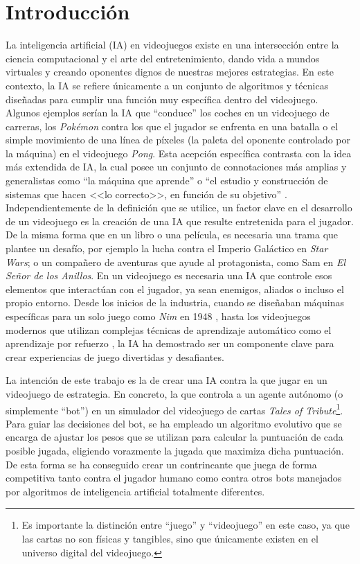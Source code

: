 \chapter{Introducción} \label{chap:introduccion}

La inteligencia artificial (IA) en videojuegos existe en una intersección entre la ciencia computacional y el arte del entretenimiento, dando vida a mundos virtuales y creando oponentes dignos de nuestras mejores estrategias. En este contexto, la IA se refiere únicamente a un conjunto de algoritmos y técnicas diseñadas para cumplir una función muy específica dentro del videojuego. Algunos ejemplos serían la IA que ``conduce'' los coches en un videojuego de carreras, los \textit{Pokémon} contra los que el jugador se enfrenta en una batalla o el simple movimiento de una línea de píxeles (la paleta del oponente controlado por la máquina) en el videojuego \textit{Pong}. Esta acepción específica contrasta con la idea más extendida de IA, la cual posee un conjunto de connotaciones más amplias y generalistas como ``la máquina que aprende'' o ``el estudio y construcción de sistemas que hacen <<lo correcto>>, en función de su objetivo'' \cite{russell_artificial_2020}. Independientemente de la definición que se utilice, un factor clave en el desarrollo de un videojuego es la creación de una IA que resulte entretenida para el jugador. De la misma forma que en un libro o una película, es necesaria una trama que plantee un desafío, por ejemplo la lucha contra el Imperio Galáctico en \textit{Star Wars}; o un compañero de aventuras que ayude al protagonista, como Sam en \textit{El Señor de los Anillos}. En un videojuego es necesaria una IA que controle esos elementos que interactúan con el jugador, ya sean enemigos, aliados o incluso el propio entorno. Desde los inicios de la industria, cuando se diseñaban máquinas específicas para un solo juego como \textit{Nim} en 1948 \cite{redheffer_machine_1948}, hasta los videojuegos modernos que utilizan complejas técnicas de aprendizaje automático como el aprendizaje por refuerzo \cite{gaudreau_game_2025}, la IA ha demostrado ser un componente clave para crear experiencias de juego divertidas y desafiantes.

La intención de este trabajo es la de crear una IA contra la que jugar en un videojuego de estrategia. En concreto, la que controla a un agente autónomo (o simplemente ``bot'') en un simulador del videojuego de cartas \textit{Tales of Tribute}\footnote{Es importante la distinción entre ``juego'' y ``videojuego'' en este caso, ya que las cartas no son físicas y tangibles, sino que únicamente existen en el universo digital del videojuego.}. Para guiar las decisiones del bot, se ha empleado un algoritmo evolutivo que se encarga de ajustar los pesos que se utilizan para calcular la puntuación de cada posible jugada, eligiendo vorazmente la jugada que maximiza dicha puntuación. De esta forma se ha conseguido crear un contrincante que juega de forma competitiva tanto contra el jugador humano como contra otros bots manejados por algoritmos de inteligencia artificial totalmente diferentes.